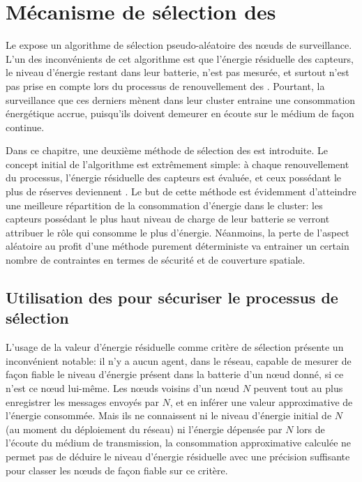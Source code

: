 \section{Mécanisme de sélection des \cns}\label{se:sec:proposal}

Le  expose un algorithme de sélection pseudo-aléatoire des nœuds de surveillance.
L'un des inconvénients de cet algorithme est que l'énergie résiduelle des capteurs, \cad le niveau d'énergie restant dans leur batterie, n'est pas mesurée, et surtout n'est pas prise en compte lors du processus de renouvellement des \cns.
Pourtant, la surveillance que ces derniers mènent dans leur cluster entraine une consommation énergétique accrue, puisqu'ils doivent demeurer en écoute sur le médium de façon continue.

Dans ce chapitre, une deuxième méthode de sélection des \cns est introduite.
Le concept initial de l'algorithme est extrêmement simple: à chaque renouvellement du processus, l'énergie résiduelle des capteurs est évaluée, et ceux possédant le plus de réserves deviennent \cns.
Le but de cette méthode est évidemment d'atteindre une meilleure répartition de la consommation d'énergie dans le cluster: les capteurs possédant le plus haut niveau de charge de leur batterie se verront attribuer le rôle qui consomme le plus d'énergie.
Néanmoins, la perte de l'aspect aléatoire au profit d'une méthode purement déterministe va entrainer un certain nombre de contraintes en termes de sécurité et de couverture spatiale.

    \subsection{Utilisation des \vns pour sécuriser le processus de sélection}\label{se:subsubsec:elec1}

L'usage de la valeur d'énergie résiduelle comme critère de sélection présente un inconvénient notable: il n'y a aucun agent, dans le réseau, capable de mesurer de façon fiable le niveau d'énergie présent dans la batterie d'un nœud donné, si ce n'est ce nœud lui-même.
Les nœuds voisins d'un nœud $N$ peuvent tout au plus enregistrer les messages envoyés par $N$, et en inférer une valeur approximative de l'énergie consommée.
Mais ils ne connaissent ni le niveau d'énergie initial de $N$ (au moment du déploiement du réseau) ni l'énergie dépensée par $N$ lors de l'écoute du médium de transmission, la consommation approximative calculée ne permet pas de déduire le niveau d'énergie résiduelle avec une précision suffisante pour classer les nœuds de façon fiable sur ce critère.

